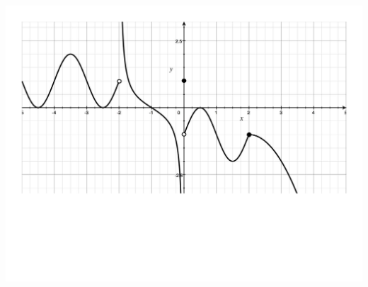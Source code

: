 \documentclass[12pt]{article}
\begin{document}
\begin{center}
\includegraphics[scale=0.5]{Limits3.pdf}
\end{center}
\end{document}
